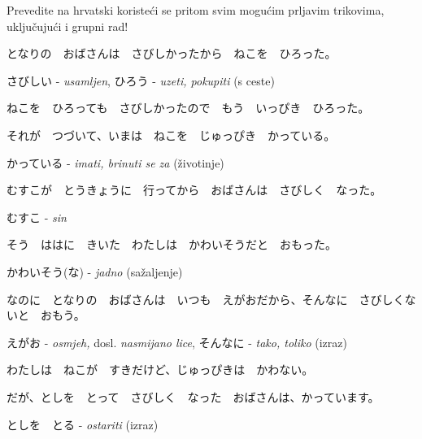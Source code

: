 
\author{Tomislav Mamić}

	
	\begin{mondai}{Prevedite na hrvatski koristeći se pritom svim mogućim prljavim trikovima, uključujući i grupni rad!}
		\item となりの　おばさんは　さびしかったから　ねこを　ひろった。
		
		さびしい - \textit{usamljen}, ひろう - \textit{uzeti, pokupiti} (s ceste)
		
		\item ねこを　ひろっても　さびしかったので　もう　いっぴき　ひろった。
		\item それが　つづいて、いまは　ねこを　じゅっぴき　かっている。
		
		かっている - \textit{imati, brinuti se za} (životinje)
		
		\item むすこが　とうきょうに　行ってから　おばさんは　さびしく　なった。
		
		むすこ - \textit{sin}
		
		\item そう　ははに　きいた　わたしは　かわいそうだと　おもった。
		
		かわいそう(な) - \textit{jadno} (sažaljenje)
		
		\item なのに　となりの　おばさんは　いつも　えがおだから、そんなに　さびしくないと　おもう。
		
		えがお - \textit{osmjeh,} dosl. \textit{nasmijano lice}, そんなに - \textit{tako, toliko} (izraz)
		
		\item わたしは　ねこが　すきだけど、じゅっぴきは　かわない。
		
		\item だが、としを　とって　さびしく　なった　おばさんは、かっています。
		
		としを　とる - \textit{ostariti} (izraz)
	\end{mondai}
